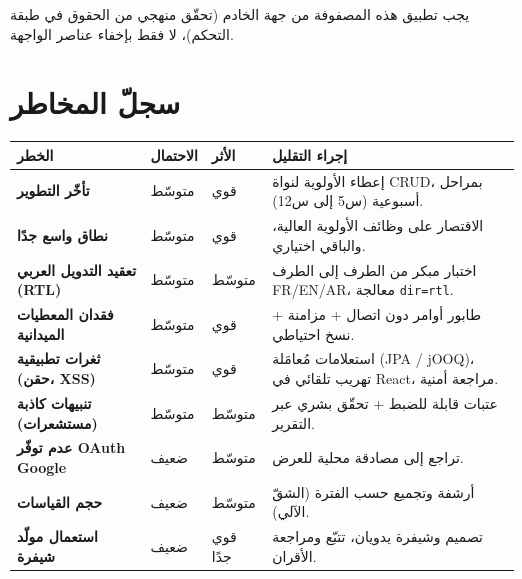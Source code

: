 \begin{encadre}
يجب تطبيق هذه المصفوفة من جهة الخادم (تحقّق منهجي من الحقوق في طبقة التحكم)، لا
فقط بإخفاء عناصر الواجهة.
\end{encadre}

\section{سجلّ المخاطر}
\begin{xltabular}{\textwidth}{>{\bfseries}p{4.6cm} C{1.8cm} C{1.6cm} X}
\toprule
\textbf{الخطر} & \textbf{الاحتمال} & \textbf{الأثر} & \textbf{إجراء التقليل} \\
\midrule
\endhead
تأخّر التطوير & متوسّط & قوي & إعطاء الأولوية لنواة CRUD، بمراحل أسبوعية (س5 إلى س12). \\
نطاق واسع جدًا & متوسّط & قوي & الاقتصار على وظائف الأولوية العالية، والباقي اختياري. \\
تعقيد التدويل العربي (RTL) & متوسّط & متوسّط & اختبار مبكر من الطرف إلى الطرف FR/EN/AR، معالجة \texttt{dir=rtl}. \\
فقدان المعطيات الميدانية & متوسّط & قوي & طابور أوامر دون اتصال + مزامنة + نسخ احتياطي. \\
ثغرات تطبيقية (حقن، XSS) & متوسّط & قوي & استعلامات مُعامَلة (JPA / jOOQ)، تهريب تلقائي في React، مراجعة أمنية. \\
تنبيهات كاذبة (مستشعرات) & متوسّط & متوسّط & عتبات قابلة للضبط + تحقّق بشري عبر التقرير. \\
عدم توفّر OAuth Google & ضعيف & متوسّط & تراجع إلى مصادقة محلية للعرض. \\
حجم القياسات & ضعيف & متوسّط & أرشفة وتجميع حسب الفترة (الشقّ الآلي). \\
استعمال مولّد شيفرة & ضعيف & قوي جدًا & تصميم وشيفرة يدويان، تتبّع ومراجعة الأقران. \\
\bottomrule
\end{xltabular}

